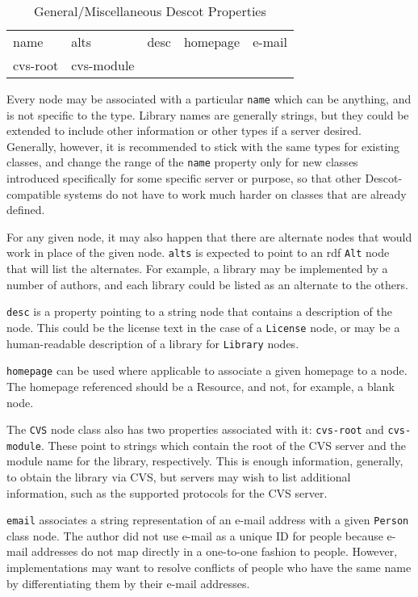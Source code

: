 \documentclass[9pt,cm,twocolumn,preprint]{sigplanconf}
\begin{document}
\begin{table}
\begin{center}
\begin{tabular}{lllll}
name & alts & desc & homepage & e-mail \\
cvs-root & cvs-module & \\
\end{tabular}
\end{center}
\caption{General/Miscellaneous Descot Properties}
\label{misc_props}
\end{table}

Every node may be associated with a particular {\tt name} which 
can be anything, and is not specific to the type. 
Library names are generally strings, but they could be extended to 
include other information or other types if a server desired. 
Generally, however, it is recommended to stick with the same types 
for existing classes, and change the range of the {\tt name} 
property only for new classes introduced specifically for some 
specific server or purpose, so that other Descot-compatible 
systems do not have to work much harder on classes that are already 
defined. 

For any given node, it may also happen that there are alternate 
nodes that would work in place of the given node. {\tt alts} 
is expected to point to an rdf {\tt Alt} node that will list the 
alternates. For example, a library may be implemented by a 
number of authors, and each library could be listed as an 
alternate to the others. 

{\tt desc} is a property pointing to a string node that contains 
a description of the node. This could be the license text in the 
case of a {\tt License} node, or may be a human-readable 
description of a library for {\tt Library} nodes. 

{\tt homepage} can be used where applicable to associate a given 
homepage to a node. The homepage referenced should be a Resource, 
and not, for example, a blank node. 

The {\tt CVS} node class also has two properties associated with 
it: {\tt cvs-root} and {\tt cvs-module}. These point to strings 
which contain the root of the CVS server and the module name for 
the library, respectively. This is enough information, generally, 
to obtain the library via CVS, but servers may wish to list 
additional information, such as the supported protocols for 
the CVS server. 

{\tt email} associates a string representation of an e-mail address 
with a given {\tt Person} class node. The author did not use e-mail as a 
unique ID for people because e-mail addresses do not map 
directly in a one-to-one fashion to people. However, implementations 
may want to resolve conflicts of people who have the same name by 
differentiating them by their e-mail addresses. 
\end{document}
